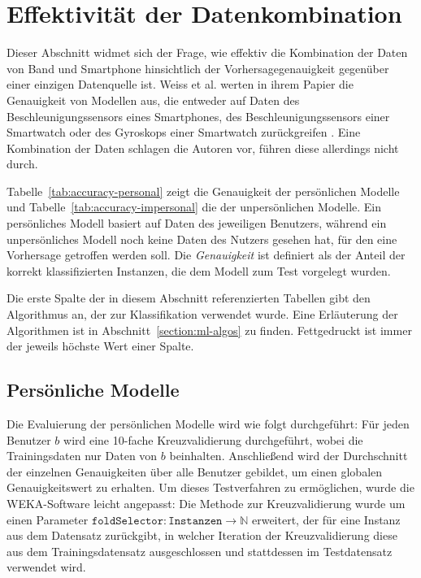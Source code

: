 \section{Effektivität der Datenkombination}
\label{sec:combination-effect}
Dieser Abschnitt widmet sich der Frage, wie effektiv die Kombination der Daten von Band und Smartphone hinsichtlich der Vorhersagegenauigkeit gegenüber einer einzigen Datenquelle ist. Weiss et al. werten in ihrem Papier die Genauigkeit von Modellen aus, die entweder auf Daten des Beschleunigungssensors eines Smartphones, des Beschleunigungssensors einer Smartwatch oder des Gyroskops einer Smartwatch zurückgreifen \cite{Weiss2016}. Eine Kombination der Daten schlagen die Autoren vor, führen diese allerdings nicht durch.

Tabelle~\ref{tab:accuracy-personal} zeigt die Genauigkeit der persönlichen Modelle und Tabelle~\ref{tab:accuracy-impersonal} die der unpersönlichen Modelle. Ein persönliches Modell basiert auf Daten des jeweiligen Benutzers, während ein unpersönliches Modell noch keine Daten des Nutzers gesehen hat, für den eine Vorhersage getroffen werden soll. Die \textit{Genauigkeit} ist definiert als der Anteil der korrekt klassifizierten Instanzen, die dem Modell zum Test vorgelegt wurden.

Die erste Spalte der in diesem Abschnitt referenzierten Tabellen gibt den Algorithmus an, der zur Klassifikation verwendet wurde. Eine Erläuterung der Algorithmen ist in Abschnitt~\ref{section:ml-algos}
zu finden. Fettgedruckt ist immer der jeweils höchste Wert einer Spalte.

\subsection{Persönliche Modelle}

Die Evaluierung der persönlichen Modelle wird wie folgt durchgeführt: Für jeden Benutzer $b$ wird eine 10-fache Kreuzvalidierung durchgeführt, wobei die Trainingsdaten nur Daten von $b$ beinhalten. Anschließend wird der Durchschnitt der einzelnen Genauigkeiten über alle Benutzer gebildet, um einen globalen Genauigkeitswert zu erhalten. Um dieses Testverfahren zu ermöglichen, wurde die WEKA-Software leicht angepasst: Die Methode zur Kreuzvalidierung wurde um einen Parameter $\texttt{foldSelector}: \texttt{Instanzen} \to \mathbb{N}$ erweitert, der für eine Instanz aus dem Datensatz zurückgibt, in welcher Iteration der Kreuzvalidierung diese aus dem Trainingsdatensatz ausgeschlossen und stattdessen im Testdatensatz verwendet wird.

